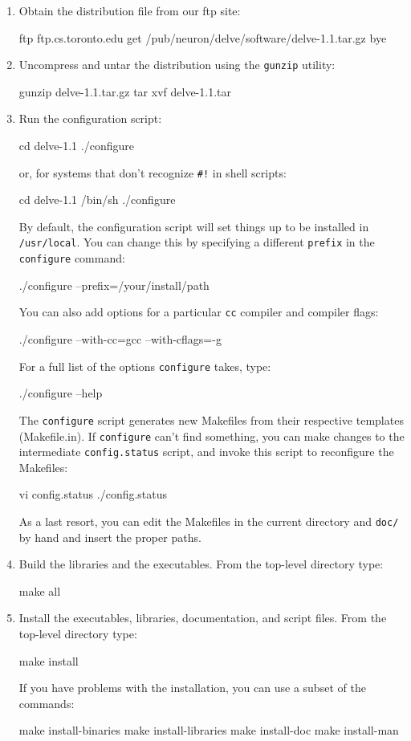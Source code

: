 \begin{enumerate}
\item
Obtain the distribution file from our ftp site:
\begin{Session}
ftp ftp.cs.toronto.edu
get /pub/neuron/delve/software/delve-1.1.tar.gz
bye
\end{Session}
%
\item
Uncompress and untar the distribution using the \texttt{gunzip}
utility:
\begin{Session}
gunzip delve-1.1.tar.gz
tar xvf delve-1.1.tar
\end{Session}
%
\item
Run the configuration script:
\begin{Session}
cd delve-1.1
./configure
\end{Session}
or, for systems that don't recognize \texttt{\#!} in shell scripts:
\begin{Session}
cd delve-1.1
/bin/sh ./configure
\end{Session}
By default, the configuration script will set things up to be
installed in \texttt{/usr/local}. You can change this by specifying a
different \texttt{prefix} in the \texttt{configure} command:
\begin{Session}
./configure --prefix=/your/install/path
\end{Session}
You can also add options for a particular \texttt{cc} compiler and
compiler flags:
\begin{Session}
./configure --with-cc=gcc --with-cflags=-g
\end{Session}
For a full list of the options \texttt{configure} takes, type:
\begin{Session}
./configure --help
\end{Session}
The \texttt{configure} script generates new Makefiles from their
respective templates (Makefile.in). If \texttt{configure} can't find
something, you can make changes to the intermediate
\texttt{config.status} script, and invoke this script to reconfigure
the Makefiles:
\begin{Session}
vi config.status
./config.status
\end{Session}
As a last resort, you can edit the Makefiles in the current directory
and \texttt{doc/} by hand and insert the proper paths.
%
\item
Build the libraries and the executables. From the top-level directory
type:
\begin{Session}
make all
\end{Session}
%
\item
Install the executables, libraries, documentation, and script
files. From the top-level directory type:
\begin{Session}
make install
\end{Session}
If you have problems with the installation, you can use a subset of
the commands:
\begin{Session}
make install-binaries
make install-libraries
make install-doc
make install-man
\end{Session}
\end{enumerate}

